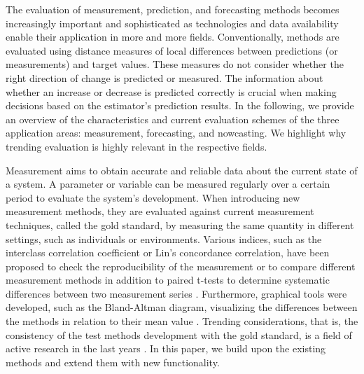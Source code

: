 The evaluation of measurement, prediction, and forecasting methods becomes increasingly important and sophisticated as technologies and data availability enable their application in more and more fields. 
Conventionally, methods are evaluated using distance measures of local differences between predictions (or measurements) and target values. 
These measures do not consider whether the right direction of change is predicted or measured.
The information about whether an increase or decrease is predicted correctly is crucial when making decisions based on the estimator's prediction results. 
In the following, we provide an overview of the characteristics and current evaluation schemes of the three application areas: measurement, forecasting, and nowcasting.
We highlight why trending evaluation is highly relevant in the respective fields.

Measurement aims to obtain accurate and reliable data about the current state of a system. 
A parameter or variable can be measured regularly over a certain period to evaluate the system's development.
When introducing new measurement methods, they are evaluated against current measurement techniques, called the gold standard, by measuring the same quantity in different settings, such as individuals or environments.
Various indices, such as the interclass correlation coefficient or Lin's concordance correlation, have been proposed to check the reproducibility of the measurement or to compare different measurement methods \parencite{lawrence1989concordance,koo2016guideline} in addition to paired t-tests to determine systematic differences between two measurement series \parencite{watson2010method}. 
Furthermore, graphical tools were developed, such as the Bland-Altman diagram, visualizing the differences between the methods in relation to their mean value \parencite{bland1986statistical}. 
Trending considerations, that is, the consistency of the test methods development with the gold standard, is a field of active research in the last years \parencite{Saugel2015,saugel2018error,hiraishi2021concordance}. 
In this paper, we build upon the existing methods and extend them with new functionality.

